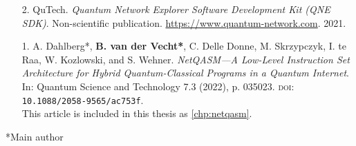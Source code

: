 \begin{enumerate}[label={\arabic*.},itemsep=0.7\baselineskip,parsep=0.3\baselineskip]
    \item[2.]
        QuTech.
        \textit{Quantum Network Explorer Software Development Kit (QNE SDK)}.
        Non-scientific publication.
        \url{https://www.quantum-network.com}.
        2021.

    \item[1.]
        A. Dahlberg*, \textbf{B. van der Vecht*}, C. Delle Donne, M. Skrzypczyk, I. te Raa, W. Kozlowski, and S. Wehner.
        \textit{NetQASM---A Low-Level Instruction Set Architecture for Hybrid Quantum-Classical Programs in a Quantum Internet}.
        In: Quantum Science and Technology 7.3 (2022), p. 035023.
        {\small \textsc{doi:}} \texttt{10.1088/2058-9565/ac753f}.
        \\ \ficon This article is included in this thesis as \cref{chp:netqasm}.
\end{enumerate}

\vskip 5mm
\centerline{*Main author}

\begin{xstretch}
\printbibliography[heading=subbibintoc,title={References},notcategory=noprint]
\end{xstretch}
